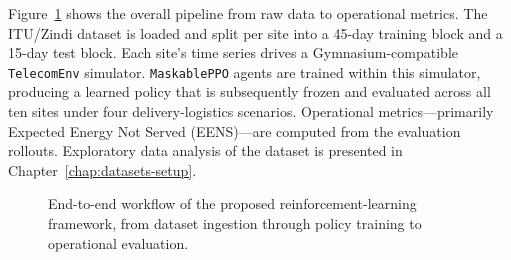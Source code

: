 Figure~\ref{fig:workflow} shows the overall pipeline from raw data to
operational metrics. The ITU/Zindi dataset is loaded and split per site
into a 45-day training block and a 15-day test block. Each site's time
series drives a Gymnasium-compatible \texttt{TelecomEnv} simulator.
\texttt{MaskablePPO} agents are trained within this simulator, producing a
learned policy that is subsequently frozen and evaluated across all ten
sites under four delivery-logistics scenarios. Operational
metrics---primarily Expected Energy Not Served (EENS)---are computed from
the evaluation rollouts. Exploratory data analysis of the dataset is
presented in Chapter~\ref{chap:datasets-setup}.

\begin{figure}[htbp]
\centering
{}
\caption{End-to-end workflow of the proposed reinforcement-learning
framework, from dataset ingestion through policy training to operational
evaluation.}
\label{fig:workflow}
\end{figure}




